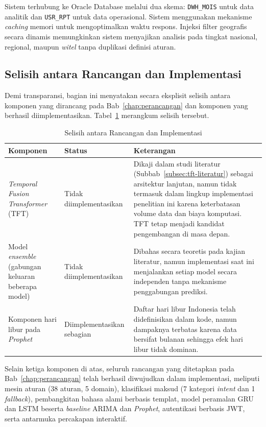 Sistem terhubung ke Oracle Database melalui dua skema: \texttt{DWH\_MOIS} untuk data analitik dan \texttt{USR\_RPT} untuk data operasional. Sistem menggunakan mekanisme \textit{caching} memori untuk mengoptimalkan waktu respons. Injeksi filter geografis secara dinamis memungkinkan sistem menyajikan analisis pada tingkat nasional, regional, maupun \textit{witel} tanpa duplikasi definisi aturan.

\subsection{Selisih antara Rancangan dan Implementasi}
\label{subsec:selisih-rancangan-implementasi}

Demi transparansi, bagian ini menyatakan secara eksplisit selisih antara komponen yang dirancang pada Bab~\ref{chap:perancangan} dan komponen yang berhasil diimplementasikan. Tabel~\ref{tab:selisih-impl} merangkum selisih tersebut.

\begin{table}[htbp]
\centering
\caption{Selisih antara Rancangan dan Implementasi}
\label{tab:selisih-impl}
\begin{tabular}{|p{3.5cm}|p{3cm}|p{6cm}|}
\hline
\textbf{Komponen} & \textbf{Status} & \textbf{Keterangan} \\
\hline
\textit{Temporal Fusion Transformer} (TFT) & Tidak diimplementasikan & Dikaji dalam studi literatur (Subbab~\ref{subsec:tft-literatur}) sebagai arsitektur lanjutan, namun tidak termasuk dalam lingkup implementasi penelitian ini karena keterbatasan volume data dan biaya komputasi. TFT tetap menjadi kandidat pengembangan di masa depan. \\
\hline
Model \textit{ensemble} (gabungan keluaran beberapa model) & Tidak diimplementasikan & Dibahas secara teoretis pada kajian literatur, namun implementasi saat ini menjalankan setiap model secara independen tanpa mekanisme penggabungan prediksi. \\
\hline
Komponen hari libur pada \textit{Prophet} & Diimplementasikan sebagian & Daftar hari libur Indonesia telah didefinisikan dalam kode, namun dampaknya terbatas karena data bersifat bulanan sehingga efek hari libur tidak dominan. \\
\hline
\end{tabular}
\end{table}

Selain ketiga komponen di atas, seluruh rancangan yang ditetapkan pada Bab~\ref{chap:perancangan} telah berhasil diwujudkan dalam implementasi, meliputi mesin aturan (38 aturan, 5 domain), klasifikasi maksud (7 kategori \textit{intent} dan 1 \textit{fallback}), pembangkitan bahasa alami berbasis templat, model peramalan GRU dan LSTM beserta \textit{baseline} ARIMA dan \textit{Prophet}, autentikasi berbasis JWT, serta antarmuka percakapan interaktif.
